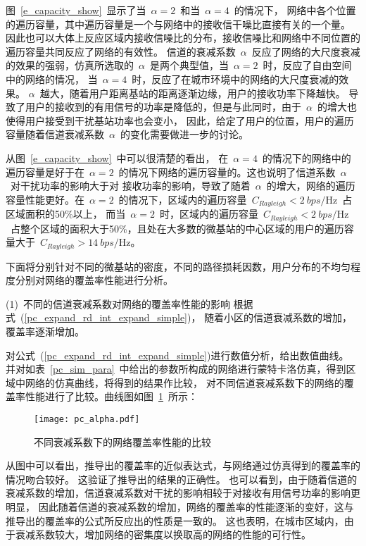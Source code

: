 图~\ref{e_capacity_show}~显示了当~$\alpha=2$~和当~$\alpha=4$~的情况下，
网络中各个位置的遍历容量，其中遍历容量是一个与网络中的接收信干噪比直接有关的一个量。
因此也可以大体上反应区域内接收信噪比的分布，接收信噪比和网络中不同位置的遍历容量共同反应了网络的有效性。
信道的衰减系数~$\alpha$~反应了网络的大尺度衰减的效果的强弱，仿真所选取的~$\alpha$~是两个典型值，当~$\alpha=2$~时，反应了自由空间中的网络的情况，
当~$\alpha=4$~时，反应了在城市环境中的网络的大尺度衰减的效果。
$\alpha$~越大，随着用户距离基站的距离逐渐边缘，用户的接收功率下降越快。
导致了用户的接收到的有用信号的功率是降低的，但是与此同时，由于~$\alpha$~的增大也使得用户接受到干扰基站功率也会变小，
因此，给定了用户的位置，用户的遍历容量随着信道衰减系数~$\alpha$~的变化需要做进一步的讨论。



从图~\ref{e_capacity_show}~中可以很清楚的看出，
在~$\alpha=4$~的情况下的网络中的遍历容量是好于在~$\alpha=2$~的情况下网络的遍历容量的。这也说明了信道系数~$\alpha$~对干扰功率的影响大于对
接收功率的影响，导致了随着~$\alpha$~的增大，网络的遍历容量性能更好。在~$\alpha = 2$~的情况下，区域内的遍历容量~$C_{Rayleigh}<2~bps/\mathrm{Hz}$~占区域面积的50\%以上，
而当~$\alpha = 2$~时，区域内的遍历容量~$C_{Rayleigh}<2~bps/\mathrm{Hz}$~占整个区域的面积大于50\%，且处在大多数的微基站的中心区域的用户的遍历容量大于~$C_{Rayleigh} > 14~bps/\mathrm{Hz}$。

下面将分别针对不同的微基站的密度，不同的路径损耗因数，用户分布的不均匀程度分别对网络的覆盖率性能进行分析。

(1)~不同的信道衰减系数对网络的覆盖率性能的影响
根据式~(\ref{pc_expand_rd_int_expand_simple})，
随着小区的信道衰减系数的增加，覆盖率逐渐增加。

对公式~(\ref{pc_expand_rd_int_expand_simple})进行数值分析，给出数值曲线。
并对如表~\ref{pc_sim_para}~中给出的参数所构成的网络进行蒙特卡洛仿真，得到区域中网络的仿真曲线，将得到的结果作比较，
对不同信道衰减系数下的网络的覆盖率性能进行了比较。曲线图如图~\ref{pc_alpha_graph}~所示：

\begin{figure}[htbp]
\centering
\texttt{[image: pc\_alpha.pdf]}
\caption{不同衰减系数下的网络覆盖率性能的比较}\vspace{-0.5em}
\label{pc_alpha_graph}
\end{figure}
从图中可以看出，推导出的覆盖率的近似表达式，与网络通过仿真得到的覆盖率的情况吻合较好。
这验证了推导出的结果的正确性。
也可以看到，由于随着信道的衰减系数的增加，信道衰减系数对干扰的影响相较于对接收有用信号功率的影响更明显，
因此随着信道的衰减系数的增加，网络的覆盖率的性能逐渐的变好，这与推导出的覆盖率的公式所反应出的性质是一致的。
这也表明，在城市区域内，由于衰减系数较大，增加网络的密集度以换取高的网络的性能的可行性。


